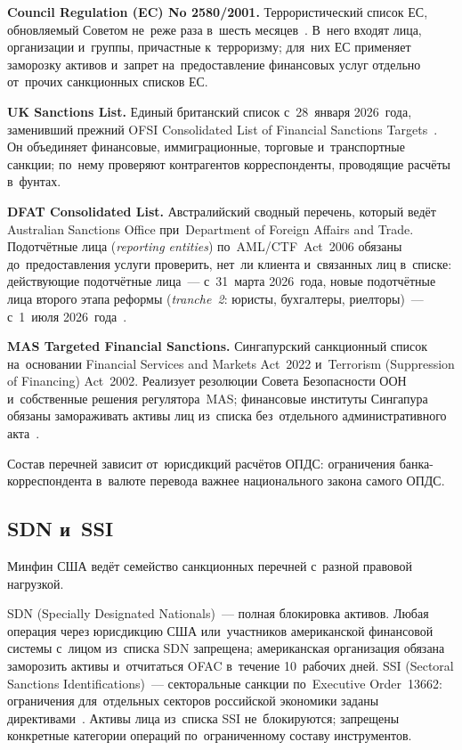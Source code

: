 \textbf{Council Regulation (EC) No 2580/2001.} Террористический список ЕС,
обновляемый Советом не~реже раза в~шесть месяцев~\cite{eu-2580-2001}. В~него
входят лица, организации и~группы, причастные к~терроризму; для~них ЕС
применяет заморозку активов и~запрет на~предоставление финансовых услуг
отдельно от~прочих санкционных списков ЕС.

\textbf{UK Sanctions List.} Единый британский список с~28~января 2026~года,
заменивший прежний OFSI Consolidated List of Financial Sanctions
Targets~\cite{uk-sanctions-list,uk-sanctions-single-list-2026}. Он объединяет финансовые,
иммиграционные, торговые и~транспортные санкции; по~нему проверяют
контрагентов корреспонденты, проводящие расчёты в~фунтах.

\textbf{DFAT Consolidated List.} Австралийский сводный перечень, который ведёт
Australian Sanctions Office при~Department of Foreign Affairs and Trade.
Подотчётные лица (\textit{reporting entities}) по~AML/CTF~Act~2006
обязаны до~предоставления услуги проверить, нет~ли клиента и~связанных
лиц в~списке: действующие подотчётные лица~--- с~31~марта
2026~года, новые подотчётные лица второго этапа реформы (\textit{tranche~2}:
юристы, бухгалтеры, риелторы)~--- с~1~июля
2026~года~\cite{au-dfat-consolidated,austrac-tfs-reform,nrf-au-amlctf-reform-2025}.

\textbf{MAS Targeted Financial Sanctions.} Сингапурский санкционный список
на~основании Financial Services and Markets Act~2022 и~Terrorism (Suppression of
Financing) Act~2002. Реализует резолюции Совета Безопасности ООН
и~собственные решения регулятора~MAS; финансовые институты Сингапура обязаны
замораживать активы лиц из~списка без~отдельного административного
акта~\cite{mas-tfs}.

Состав перечней зависит от~юрисдикций расчётов ОПДС: ограничения
банка-корреспондента в~валюте перевода важнее национального закона самого ОПДС.

\subsection*{SDN и~SSI}

Минфин США ведёт семейство санкционных перечней с~разной правовой нагрузкой.

SDN (Specially Designated Nationals)~--- полная блокировка активов. Любая
операция через юрисдикцию США или~участников американской финансовой системы
с~лицом из~списка SDN запрещена; американская организация обязана заморозить активы
и~отчитаться OFAC в~течение 10~рабочих дней. SSI (Sectoral Sanctions
Identifications)~--- секторальные санкции по~Executive Order~13662: ограничения
для~отдельных секторов российской экономики заданы
директивами~\cite{eo-13662,ofac-ssi-list}. Активы лица из~списка SSI
не~блокируются; запрещены конкретные категории операций по~ограниченному
составу инструментов.

